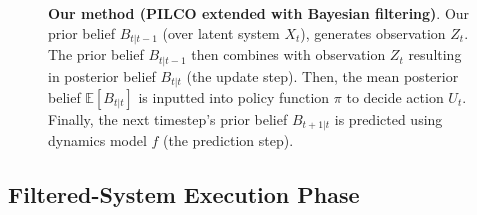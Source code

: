 \documentclass{article}
\newcommand{\E}{{\mathbb E}}
\newcommand{\pno}[1]{#1_{t|t-1}}   %
\newcommand{\uno}[1]{#1_{t|t}}     %
\newcommand{\pne}[1]{#1_{t+1|t}}   %
\newcommand{\now}[1]{#1_t}
\newcommand{\new}[1]{#1_{t+1}}
\newcommand{\fb}{f} %
\begin{document}
\begin{figure}[t]
\begin{minipage}[t]{0.52\textwidth}
\caption{
\textbf{Our method (PILCO extended with Bayesian filtering)}.
Our prior belief $\pno{B}$ (over latent system $\now{X}$),
generates observation $\now{Z}$.
The prior belief $\pno{B}$
then combines with observation $\now{Z}$
resulting in posterior belief $\uno{B}$ (the update step).
Then, the mean posterior belief $\E[\uno{B}]$
is
inputted into policy function $\pi$ to decide action $\now{U}$.
Finally, the next timestep's
prior belief $\pne{B}$ is predicted using dynamics model $\fb$
(the prediction step).
}
\label{fig:ctrlbf} %
\end{minipage}
\end{figure} %

\subsection{Filtered-System Execution Phase}\label{sec:filtered-execution}
\end{document}
